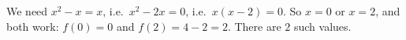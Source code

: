 We need $x^2-x=x$, i.e.\ $x^2-2x=0$, i.e.\ $x(x-2)=0$. So $x=0$ or $x=2$, and both work: $f(0)=0$ and $f(2)=4-2=2$. There are $\boxed{2}$ such values.
